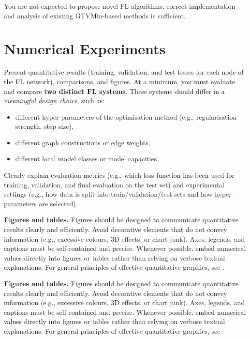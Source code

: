 \documentclass[9pt]{article}
\begin{document}
\begin{hintbox}
You are not expected to propose novel FL algorithms; correct implementation and analysis of existing GTVMin-based methods is sufficient.
\end{hintbox}
	
\section{Numerical Experiments}
\label{sec:experiments}

\begin{hintbox}
	Present quantitative results (training, validation, and test losses for each node of the FL network), 
	comparisons, and figures.
	At a minimum, you must evaluate and compare \textbf{two distinct FL systems}. 
	These systems should differ in a \emph{meaningful design choice}, such as:
	\begin{itemize}
		\item different hyper-parameters of the optimisation method (e.g., regularisation strength, step size),
		\item different graph constructions or edge weights,
		\item different local model classes or model capacities.
	\end{itemize}
	Clearly explain evaluation metrics (e.g., which loss function has been used 
	for training, validation, and final evaluation on the test set) and experimental 
	settings (e.g., how data is split into train/validation/test sets and how hyper-parameters 
	are selected).
\end{hintbox}

\begin{hintbox}
	\textbf{Figures and tables.} 
	Figures should be designed to communicate quantitative results clearly and efficiently.
	Avoid decorative elements that do not convey information (e.g., excessive colours, 3D effects, 
	or chart junk). Axes, legends, and captions must be self-contained and precise. 
	Whenever possible, embed numerical values directly into figures or tables rather 
	than relying on verbose textual explanations. For general principles of effective 
	quantitative graphics, see \cite{TufteVDQI}.
\end{hintbox}



\begin{hintbox}
\textbf{Figures and tables.} 
Figures should be designed to communicate quantitative results clearly and efficiently.
Avoid decorative elements that do not convey information (e.g., excessive colours, 3D effects, 
or chart junk). Axes, legends, and captions must be self-contained and precise. 
Whenever possible, embed numerical values directly into figures or tables rather 
than relying on verbose textual explanations. For general principles of effective 
quantitative graphics, see \cite{TufteVDQI}
\end{hintbox}
\end{document}

